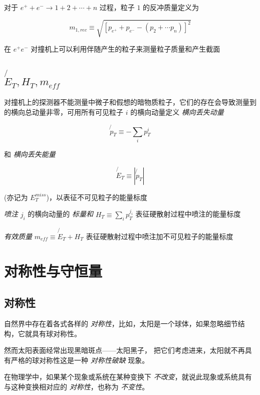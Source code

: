 \documentclass[oneside,a4paper,openany,11pt]{ctexbook}
\begin{document}
对于 $e^+ + e^- \to 1 + 2 + \cdots + n$ 过程，粒子 $1$ 的反冲质量定义为

\begin{equation}
    m_{1, rec} \equiv \sqrt{[p_{e^+} + p_{e^-} - (p_2 + \cdots p_n)]^2}
\end{equation}

在 $e^+ e^-$ 对撞机上可以利用伴随产生的粒子来测量粒子质量和产生截面

\subsection{$\not{E}_T, H_T, m_{eff}$}

对撞机上的探测器不能测量中微子和假想的暗物质粒子，它们的存在会导致测量到的横向总动量非零，可用所有可见粒子 $i$ 的横向动量定义 \emph{横向丢失动量}

\begin{equation}
    \not{p}_T \equiv -\sum_i p^i_T
\end{equation}

和 \emph{横向丢失能量}

\begin{equation}
    \not{E}_T \equiv |\not{p}_T|
\end{equation}

(亦记为 $E^{miss}_T$)，以表征不可见粒子的能量标度

\emph{喷注} $j_i$ 的横向动量的 \emph{标量和} $H_T \equiv \sum_i p^{j_i}_T$ 表征硬散射过程中喷注的能量标度

\emph{有效质量} $m_{eff} \equiv \not{E}_T + H_T$ 表征硬散射过程中喷注加不可见粒子的能量标度

\section{对称性与守恒量}

\subsection{对称性}

自然界中存在着各式各样的 \emph{对称性}，比如，太阳是一个球体，如果忽略细节结构，它就具有球对称性。

然而太阳表面经常出现黑暗斑点——太阳黑子， 把它们考虑进来，太阳就不再具有严格的球对称性这是一种 \emph{对称性破缺} 现象。

在物理学中，如果某个现象或系统在某种变换下 \emph{不改变}，就说此现象或系统具有
与这种变换相对应的 \emph{对称性}，也称为 \emph{不变性}。
\end{document}
